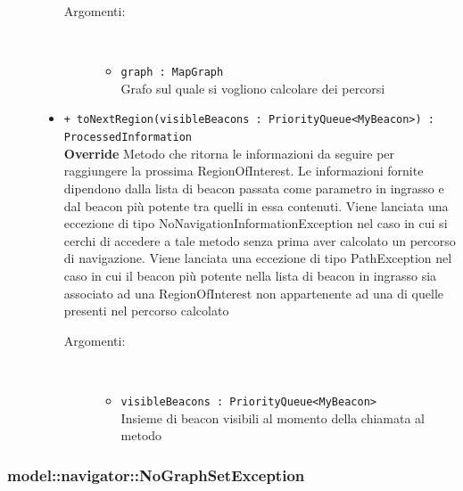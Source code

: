 \documentclass[../DefinizioneDiProdotto.tex]{subfiles}
\begin{document}
\begin{description}
\begin{itemize}
\begin{description}
\item[Argomenti:] \
\begin{itemize}
\item \texttt{graph : MapGraph}\\
Grafo sul quale si vogliono calcolare dei percorsi\end{itemize}
\end{description}
\item \texttt{+ toNextRegion(visibleBeacons : PriorityQueue<MyBeacon>) : ProcessedInformation}\\
\textbf{Override} Metodo che ritorna le informazioni da seguire per raggiungere la prossima RegionOfInterest. Le informazioni fornite dipendono dalla lista di beacon passata come parametro in ingrasso e dal beacon più potente tra quelli in essa contenuti. Viene lanciata una eccezione di tipo NoNavigationInformationException nel caso in cui si cerchi di accedere a tale metodo senza prima aver calcolato un percorso di navigazione. Viene lanciata una eccezione di tipo PathException nel caso in cui il beacon più potente nella lista di beacon in ingrasso sia associato ad una RegionOfInterest non appartenente ad una di quelle presenti nel percorso calcolato
 \begin{description}
\item[Argomenti:] \
\begin{itemize}
\item \texttt{visibleBeacons : PriorityQueue<MyBeacon>}\\
Insieme di beacon visibili al momento della chiamata al metodo\end{itemize}
\end{description}
\end{itemize}
\end{description}

\subsubsection{model::navigator::NoGraphSetException}
\end{document}
